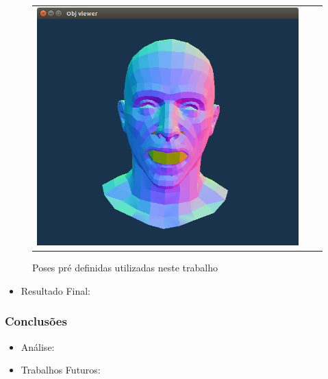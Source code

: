 \documentclass[brazil]{beamer}
\begin{document}
\begin{frame}
\begin{itemize}
\begin{figure}
\begin{tabular}{ccc}
\includegraphics[width=0.3\linewidth]{./img/open-mouth.png} \\
	\end{tabular}
	\caption{Poses pré definidas utilizadas neste trabalho}
     \end{figure}         
  \end{itemize} 
\end{frame}


\begin{frame}
  \begin{itemize}
      \item Resultado Final:
              
  \end{itemize} 
\end{frame}


\begin{frame}
\frametitle{Conclusões}
  \begin{itemize}
      \item Análise:
      
      \item Trabalhos Futuros:
              
  \end{itemize} 
\end{frame}
\end{document}
